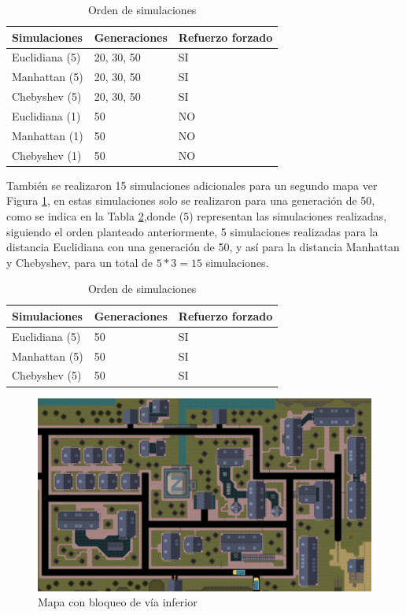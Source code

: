 \documentclass[conference]{IEEEtran}
\begin{document}
\begin{table}
\centering
\caption{Orden de simulaciones}
\label{tab:fds_1}
\begin{tabular}{lll}
\toprule
\textbf{Simulaciones} & 
\textbf{Generaciones}  &
\textbf{Refuerzo forzado}\\
\midrule
Euclidiana (5)   &  20, 30, 50 & SI\\
Manhattan (5)     &  20, 30, 50 & SI\\
Chebyshev (5)     &  20, 30, 50 & SI\\
\bottomrule
Euclidiana (1)    & 50 & NO\\
Manhattan (1)     & 50 & NO\\
Chebyshev  (1)    & 50 & NO\\
\bottomrule
\end{tabular}
\end{table}

También se realizaron 15 simulaciones adicionales para un segundo mapa ver Figura \ref{fig:mapa2}, en estas simulaciones solo se realizaron para una generación de 50, como se indica en la Tabla \ref{tab:fds_2},donde (5) representan las simulaciones realizadas, siguiendo el orden planteado anteriormente, 5 simulaciones realizadas para la distancia Euclidiana con una generación de 50, y así para la distancia Manhattan y Chebyshev, para un total de $5*3=15$ simulaciones.

\begin{table}
\centering
\caption{Orden de simulaciones}
\label{tab:fds_2}
\begin{tabular}{lll}
\toprule
\textbf{Simulaciones} & 
\textbf{Generaciones}  &
\textbf{Refuerzo forzado}\\
\midrule
Euclidiana (5)   &50 & SI\\
Manhattan (5)     &50 & SI\\
Chebyshev (5)     &50 & SI\\
\bottomrule
\end{tabular}
\end{table}


\begin{figure}
    \centering    \includegraphics[width=0.8\linewidth]{Simulacion/gta.png}
    \caption{Mapa con bloqueo de vía inferior}
    \label{fig:mapa2}
\end{figure}
\end{document}
